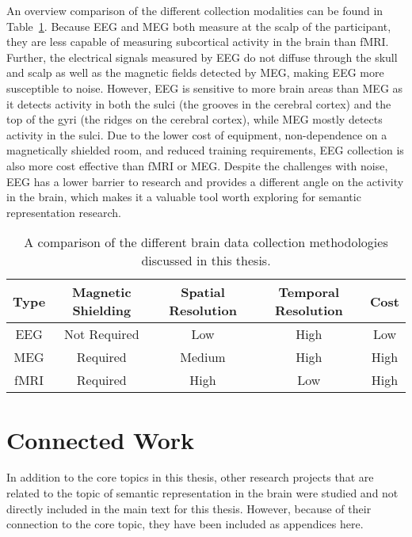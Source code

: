 An overview comparison of the different collection modalities can be found in 
Table~\ref{table:modalities}. Because EEG and MEG both measure at the scalp of 
the participant, they are less capable of measuring subcortical activity in the 
brain than fMRI. Further, the electrical signals measured by EEG do not diffuse 
through the skull and scalp as well as the magnetic fields detected by MEG, 
making EEG more susceptible to noise. However, EEG is sensitive to more brain 
areas than MEG as it detects activity in both the sulci (the grooves in the 
cerebral cortex) and the top of the gyri (the ridges on the cerebral cortex), 
while MEG mostly detects activity in the sulci. Due to the lower cost of 
equipment, non-dependence on a magnetically shielded room, and reduced training 
requirements, EEG collection is also more cost effective than fMRI or MEG.  
Despite the challenges with noise, EEG has a lower barrier to research and 
provides a different angle on the activity in the brain, which makes it a 
valuable tool worth exploring for semantic representation research. 

\begin{table}[t]
  \begin{center}
    \def\arraystretch{1.5}
    \begin{tabular}{ |c|c|c|c|c| }
      \hline
      Type & Magnetic Shielding & Spatial Resolution & Temporal 
      Resolution & Cost \\
      \hline
      EEG & Not Required & Low & High & Low \\
      MEG & Required & Medium & High & High \\
      fMRI & Required & High & Low & High \\
      \hline
    \end{tabular}
  \end{center}
  \caption[Collection Methodologies Comparison]{
    A comparison of the different brain data collection methodologies discussed 
    in this thesis.
  }
  \label{table:modalities}
\end{table}

\section{Connected Work}

In addition to the core topics in this thesis, other research projects that are 
related to the topic of semantic representation in the brain were studied and 
not directly included in the main text for this thesis. However, because of 
their connection to the core topic, they have been included as appendices here.


